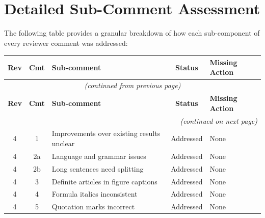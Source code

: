 \documentclass[journal,twoside,web]{ieeecolor}
\begin{document}
\newpage
\section*{Detailed Sub-Comment Assessment}

The following table provides a granular breakdown of how each sub-component of every reviewer comment was addressed:

\begin{longtable}{|c|c|p{5.5cm}|c|p{3.5cm}|}
\hline
\textbf{Rev} & \textbf{Cmt} & \textbf{Sub-comment} & \textbf{Status} & \textbf{Missing Action} \\
\hline
\endfirsthead
\multicolumn{5}{c}{\textit{(continued from previous page)}} \\
\hline
\textbf{Rev} & \textbf{Cmt} & \textbf{Sub-comment} & \textbf{Status} & \textbf{Missing Action} \\
\hline
\endhead
\hline
\multicolumn{5}{r}{\textit{(continued on next page)}} \\
\endfoot
\hline
\endlastfoot

4 & 1 & Improvements over existing results unclear & Addressed & None \\
\hline
4 & 2a & Language and grammar issues & Addressed & None \\
\hline
4 & 2b & Long sentences need splitting & Addressed & None \\
\hline
4 & 3 & Definite articles in figure captions & Addressed & None \\
\hline
4 & 4 & Formula italics inconsistent & Addressed & None \\
\hline
4 & 5 & Quotation marks incorrect & Addressed & None \\
\hline


\end{longtable}
\end{document}
